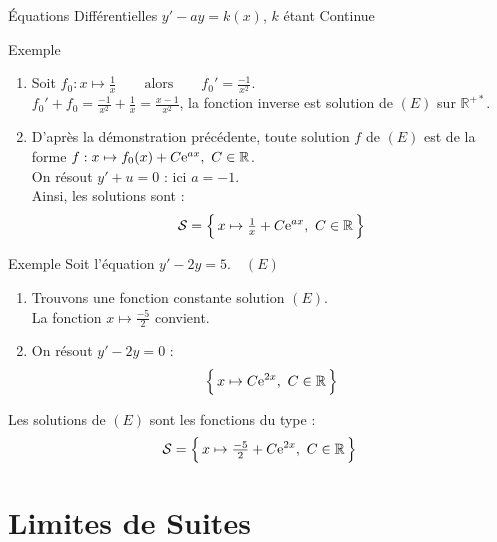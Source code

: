 \documentclass{coursbook}
\begin{document}
\begin{Gpartie}{Équations Différentielles $y'-ay=k(x)$, $k$ étant Continue}
\begin{Spartie}{Exemple}
            \begin{enumerate}
                \item Soit $f_0:x\mapsto\frac{1}{x}\qquad\text{alors}\qquad f_0'=\frac{-1}{x^2}$. \\
                $f_0'+f_0=\frac{-1}{x^2}+\frac{1}{x}=\frac{x-1}{x^2}$, la fonction inverse est solution de $(E)$ sur $\mathbb{R^{+*}}$.
                \item D'après la démonstration précédente, toute solution $f$ de $(E)$ est de la forme $f:x\mapsto f_0(x)+C\me^{ax},\ C\in\mathbb{R}$. \\
                On résout $y'+u=0$ : ici $a=-1$. \\
                Ainsi, les solutions sont :
                \[\mathcal{S}=\Big\{\,x\mapsto\tfrac{1}{x}+C\me^{ax},\ C\in\mathbb{R}\,\Big\}\]
            \end{enumerate}
        \end{Spartie}
        \begin{Spartie}{Exemple} 
            Soit l'équation $y'-2y=5$.$\quad(E)$
            \begin{enumerate}
                \item Trouvons une fonction constante solution $(E)$. \\
                La fonction $x\mapsto\frac{-5}{2}$ convient.
                \item On résout $y'-2y=0$ :
                \[\Big\{\,x\mapsto C\me^{2x},\ C\in\mathbb{R}\,\Big\}\]
            \end{enumerate}

            Les solutions de $(E)$ sont les fonctions du type :
            \[\mathcal{S}=\Big\{\,x\mapsto\tfrac{-5}{2}+C\me^{2x},\ C\in\mathbb{R}\,\Big\}\]
        \end{Spartie}
    \end{Gpartie}



    \chapter{Limites de Suites}
\end{document}
